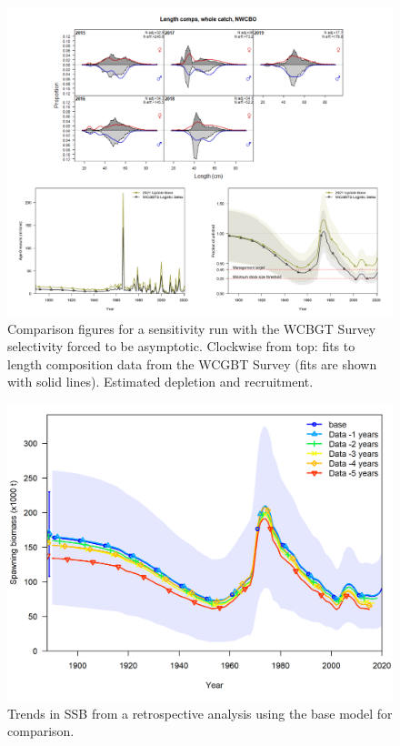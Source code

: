 \documentclass[11pt,
  english,
  a4paper,
]{article}
\begin{document}
\begin{figure}
\centering
\includegraphics[width=1\textwidth,height=1\textheight]{figs/asympNWFSC_sens.png}
\caption{Comparison figures for a sensitivity run with the WCBGT Survey selectivity forced to be asymptotic. Clockwise from top: fits to length composition data from the WCGBT Survey (fits are shown with solid lines). Estimated depletion and recruitment. \label{fig:asympNWFSC}}
\end{figure}

\tagmcend\tagstructend


\begin{figure}
\centering
\includegraphics[width=1\textwidth,height=0.5\textheight]{figs/retro_base_ssb.png}
\caption{Trends in SSB from a retrospective analysis using the base model for comparison.\label{fig:retroSB}}
\end{figure}
\end{document}
